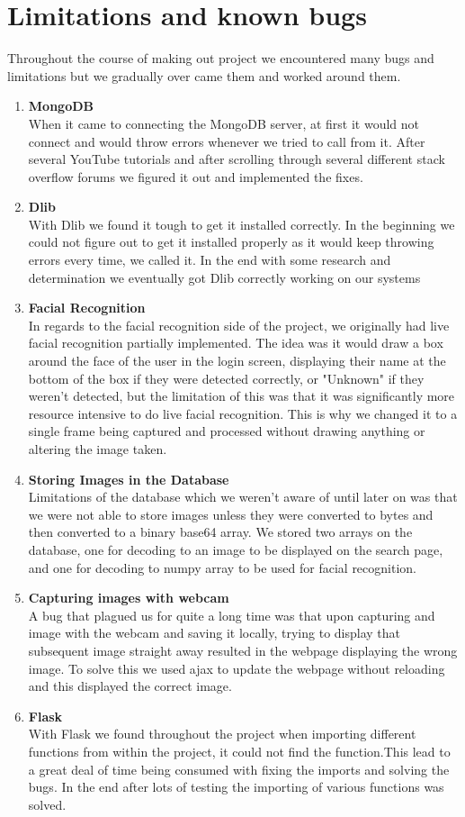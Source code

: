 \documentclass{article}
\begin{document}
\newpage

\section{Limitations and known bugs}
Throughout the course of making out project we encountered many bugs and limitations but we gradually over came them and worked around them.
\begin{enumerate}
\item \textbf{MongoDB} \\
When it came to connecting the MongoDB server, at first it would not connect and would throw errors whenever we tried to call from it. After several YouTube tutorials and after scrolling through several different stack overflow forums we figured it out and implemented the fixes. 
\item \textbf{Dlib} \\
With Dlib we found it tough to get it installed correctly. In the beginning we could not figure out to get it installed properly as it would keep throwing errors every time, we called it. In the end with some research and determination we eventually got Dlib correctly working on our systems
\item \textbf{Facial Recognition} \\
In regards to the facial recognition side of the project, we originally had live facial recognition partially implemented. The idea was it would draw a box around the face of the user in the login screen, displaying their name at the bottom of the box if they were detected correctly, or "Unknown" if they weren't detected, but the limitation of this was that it was significantly more resource intensive to do live facial recognition. This is why we changed it to a single frame being captured and processed without drawing anything or altering the image taken.
\item \textbf{Storing Images in the Database} \\
Limitations of the database which we weren't aware of until later on was that we were not able to store images unless they were converted to bytes and then converted to a binary base64 array. We stored two arrays on the database, one for decoding to an image to be displayed on the search page, and one for decoding to numpy array to be used for facial recognition.
\item \textbf{Capturing images with webcam} \\
A bug that plagued us for quite a long time was that upon capturing and image with the webcam and saving it locally, trying to display that subsequent image straight away resulted in the webpage displaying the wrong image. To solve this we used ajax to update the webpage without reloading and this displayed the correct image.
\item \textbf{Flask} \\
With Flask we found throughout the project when importing different functions from within the project, it could not find the function.This lead to a great deal of time being consumed with fixing the imports and solving the bugs. In the end after lots of testing the importing of various functions was solved.


\end{enumerate}
\end{document}
